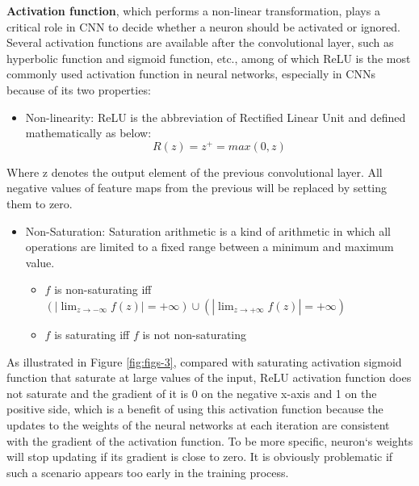 \documentclass[]{krantz}
\providecommand{\tightlist}{%
  \setlength{\itemsep}{0pt}\setlength{\parskip}{0pt}}
\begin{document}
\textbf{Activation function}, which performs a non-linear transformation, plays a critical role in CNN to decide whether a neuron should be activated or ignored. Several activation functions are available after the convolutional layer, such as hyperbolic function and sigmoid function, etc., among of which ReLU is the most commonly used activation function in neural networks, especially in CNNs\citep{Krizhevsky2012ImageNetCW} because of its two properties:

\begin{itemize}
\tightlist
\item
  Non-linearity: ReLU is the abbreviation of Rectified Linear Unit and defined mathematically as below:
  \[ R(z)=z^{+}= max(0,z)\]
\end{itemize}

Where z denotes the output element of the previous convolutional layer. All negative values of feature maps from the previous will be replaced by setting them to zero.

\begin{itemize}
\tightlist
\item
  Non-Saturation: Saturation arithmetic is a kind of arithmetic in which all operations are limited to a fixed range between a minimum and maximum value.

  \begin{itemize}
  \tightlist
  \item
    \(f\) is non-saturating iff \((|\displaystyle{\lim_{z \to -\infty}f(z)}|=+\infty) \cup (|\displaystyle{\lim_{z \to +\infty}f(z)}|=+\infty)\)
  \item
    \(f\) is saturating iff \(f\) is not non-saturating
  \end{itemize}
\end{itemize}

As illustrated in Figure \ref{fig:figs-3}, compared with saturating activation sigmoid function that saturate at large values of the input, ReLU activation function does not saturate\citep{Krizhevsky2012ImageNetCW} and the gradient of it is 0 on the negative x-axis and 1 on the positive side, which is a benefit of using this activation function because the updates to the weights of the neural networks at each iteration are consistent with the gradient of the activation function. To be more specific, neuron`s weights will stop updating if its gradient is close to zero. It is obviously problematic if such a scenario appears too early in the training process.
\end{document}
